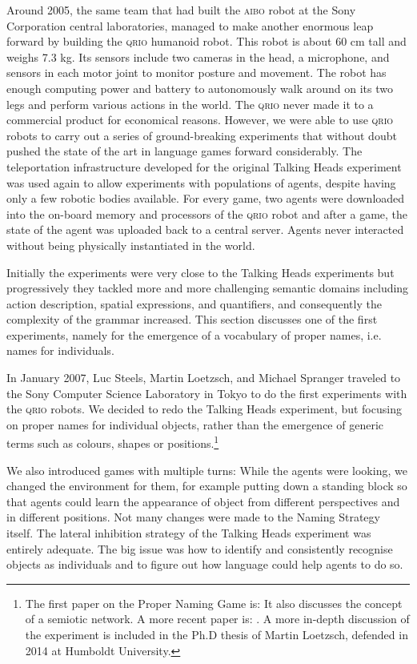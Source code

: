 Around 2005, the same team that had built the \textsc{aibo} robot at the Sony Corporation central laboratories, managed to 
make another enormous leap forward by building 
the \textsc{qrio} humanoid robot. This robot is about 60 cm tall and weighs 7.3 kg. Its sensors
include two cameras in the head, a microphone, and sensors in each motor joint to monitor posture and movement. The robot has enough
computing power and battery to autonomously walk around on its two legs and perform various actions in the world.
The \textsc{qrio} never made it to a commercial product for economical reasons. However, we were able to use \textsc{qrio} robots to 
carry out a series of ground-breaking experiments that without doubt pushed the state of the art in language games
forward considerably. 
The teleportation infrastructure developed for the original Talking Heads experiment was used again 
to allow experiments with populations of agents, despite having only a few robotic bodies available. 
For every game, two agents were downloaded into the on-board memory and processors 
of the \textsc{qrio} robot and after a game, the state of the agent was uploaded back to a central server. Agents never
interacted without being physically instantiated in the world. 

Initially the experiments were very close to the Talking Heads experiments but progressively 
they tackled more and more challenging semantic domains
including action description, spatial expressions, and quantifiers, and consequently
the complexity of the grammar increased. This section discusses one of the first experiments, namely 
for the emergence of a vocabulary of proper names, i.e. names for individuals.

In January 2007, Luc Steels, Martin Loetzsch, and Michael Spranger traveled to the Sony Computer Science Laboratory 
in Tokyo to do the first experiments with the \textsc{qrio} robots.  
We decided to redo the Talking Heads experiment, but focusing on proper names for individual objects, rather than the emergence 
of generic terms such as colours, shapes or positions.\footnote{The first paper on the Proper Naming Game is: \cite{Steels:2007}
It also discusses the concept of a semiotic network. 
A more recent paper is: \cite{Steels:2012b}. A more 
in-depth discussion of the experiment is included 
in the Ph.D thesis of Martin Loetzsch, defended in 2014 at Humboldt University.}

We also introduced games with multiple turns: While the agents were looking, we 
changed the environment for them, for example putting down a standing block so that 
agents could learn the appearance of object from different perspectives and in different positions. 
Not many changes were made to the Naming Strategy itself. The 
lateral inhibition strategy of the Talking Heads experiment was entirely adequate. The big issue was how to 
identify and consistently recognise objects as individuals and to figure out how language could help agents to do so. 

